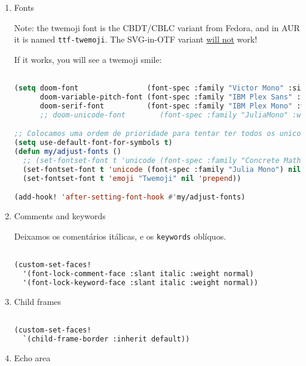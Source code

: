 \documentclass[11pt]{article}
\begin{document}
\begin{enumerate}
  \item Fonts
  \label{sec:fonts}

  Note: the twemoji font is the CBDT/CBLC variant from Fedora, and in AUR it is named \texttt{ttf-twemoji}. The SVG-in-OTF variant \uline{will not} work!

If it works, you will see a twemoji smile: 🙂

\begin{lstlisting}[language=Lisp]%! Someone please complete this list for me

(setq doom-font                (font-spec :family "Victor Mono" :size 19 :weight 'medium)
      doom-variable-pitch-font (font-spec :family "IBM Plex Sans" :size 19 :weight 'normal)
      doom-serif-font          (font-spec :family "IBM Plex Mono" :weight 'light))
      ;; doom-unicode-font        (font-spec :family "JuliaMono" :weight 'normal))

;; Colocamos uma ordem de prioridade para tentar ter todos os unicodes e emojis.
(setq use-default-font-for-symbols t)
(defun my/adjust-fonts ()
  ;; (set-fontset-font t 'unicode (font-spec :family "Concrete Math"))
  (set-fontset-font t 'unicode (font-spec :family "Julia Mono") nil 'append)
  (set-fontset-font t 'emoji "Twemoji" nil 'prepend))

(add-hook! 'after-setting-font-hook #'my/adjust-fonts)
\end{lstlisting}
  \item Comments and keywords
  \label{sec:comments-and-keywords}

  Deixamos os comentários itálicas, e os \lstinline|keywords| oblíquos.

\begin{lstlisting}[language=Lisp]%! Someone please complete this list for me

(custom-set-faces!
  '(font-lock-comment-face :slant italic :weight normal)
  '(font-lock-keyword-face :slant italic :weight normal))
\end{lstlisting}
  \item Child frames
  \label{sec:child-frames}

  \begin{lstlisting}[language=Lisp]%! Someone please complete this list for me

(custom-set-faces!
  `(child-frame-border :inherit default))
\end{lstlisting}
  \item Echo area
  \label{sec:echo-area}


\end{enumerate}
\end{document}
